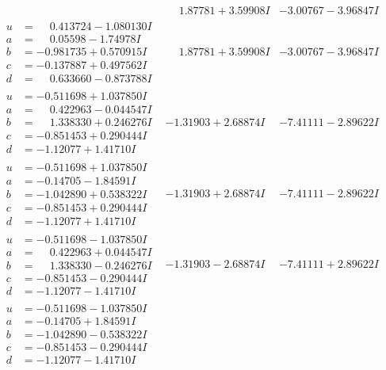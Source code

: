 \documentclass[1p]{elsarticle_modified}
\theoremstyle{definition}
\begin{document}
$$\begin{array}{c|c|c}
 & \phantom{-}1.87781 + 3.59908 I & -3.00767 - 3.96847 I \\ \hline\begin{aligned}
u &= \phantom{-}0.413724 - 1.080130 I \\
a &= \phantom{-}0.05598 - 1.74978 I \\
b &= -0.981735 + 0.570915 I \\
c &= -0.137887 + 0.497562 I \\
d &= \phantom{-}0.633660 - 0.873788 I\end{aligned}
 & \phantom{-}1.87781 + 3.59908 I & -3.00767 - 3.96847 I \\ \hline\begin{aligned}
u &= -0.511698 + 1.037850 I \\
a &= \phantom{-}0.422963 - 0.044547 I \\
b &= \phantom{-}1.338330 + 0.246276 I \\
c &= -0.851453 + 0.290444 I \\
d &= -1.12077 + 1.41710 I\end{aligned}
 & -1.31903 + 2.68874 I & -7.41111 - 2.89622 I \\ \hline\begin{aligned}
u &= -0.511698 + 1.037850 I \\
a &= -0.14705 - 1.84591 I \\
b &= -1.042890 + 0.538322 I \\
c &= -0.851453 + 0.290444 I \\
d &= -1.12077 + 1.41710 I\end{aligned}
 & -1.31903 + 2.68874 I & -7.41111 - 2.89622 I \\ \hline\begin{aligned}
u &= -0.511698 - 1.037850 I \\
a &= \phantom{-}0.422963 + 0.044547 I \\
b &= \phantom{-}1.338330 - 0.246276 I \\
c &= -0.851453 - 0.290444 I \\
d &= -1.12077 - 1.41710 I\end{aligned}
 & -1.31903 - 2.68874 I & -7.41111 + 2.89622 I \\ \hline\begin{aligned}
u &= -0.511698 - 1.037850 I \\
a &= -0.14705 + 1.84591 I \\
b &= -1.042890 - 0.538322 I \\
c &= -0.851453 - 0.290444 I \\
d &= -1.12077 - 1.41710 I\end{aligned}

\end{array}$$
\end{document}

